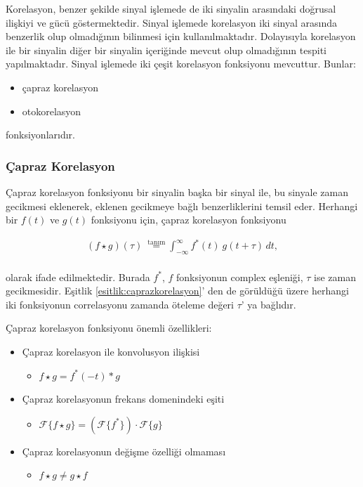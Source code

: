 \documentclass[turkish]{report}
\begin{document}
Korelasyon, benzer şekilde sinyal işlemede de iki sinyalin arasındaki doğrusal ilişkiyi ve gücü göstermektedir. Sinyal işlemede korelasyon iki sinyal arasında benzerlik olup olmadığının bilinmesi için kullanılmaktadır\cite{realtimesignalprocessing}. Dolayısıyla korelasyon ile bir sinyalin diğer bir sinyalin içeriğinde mevcut olup olmadığının tespiti yapılmaktadır. Sinyal işlemede iki çeşit korelasyon fonksiyonu mevcuttur. Bunlar: 
\\

\begin{itemize}
\item çapraz korelasyon
\item otokorelasyon 
\end{itemize}

fonksiyonlarıdır. 

\subsubsection*{Çapraz Korelasyon}

Çapraz korelasyon fonksiyonu bir sinyalin başka bir sinyal ile, bu sinyale zaman gecikmesi eklenerek, eklenen gecikmeye bağlı benzerliklerini temsil eder. Herhangi bir  $f\left(t\right)$ ve $g\left(t\right)$ fonksiyonu için, çapraz korelasyon fonksiyonu

\begin{align}
(f \star g)(\tau)\ \stackrel{\mathrm{tanım}}{=} \int_{-\infty}^{\infty} f^*(t)\ g(t+\tau)\,dt,
\label{esitlik:caprazkorelasyon}
\end{align}
\\
olarak ifade edilmektedir. Burada $f^*$, $f$ fonksiyonun complex eşleniği, $\tau$ ise zaman gecikmesidir. Eşitlik \ref{esitlik:caprazkorelasyon}' den de görüldüğü üzere herhangi iki fonksiyonun correlasyonu zamanda öteleme değeri $\tau$' ya bağlıdır.

Çapraz korelasyon fonksiyonu önemli özellikleri:\\

\begin{itemize}
\item[]{Çapraz korelasyon ile konvolusyon ilişkisi}
\begin{itemize}
\item[]{$f\star g = f^*(-t)*g$}
\end{itemize}
\item[]{Çapraz korelasyonun frekans domenindeki eşiti}
\begin{itemize}
\item[]{$\mathcal{F}\{f\star g\}=(\mathcal{F}\{f^*\}) \cdot \mathcal{F}\{g\}$}
\end{itemize}
\item[]{Çapraz korelasyonun değişme özelliği olmaması}
\begin{itemize}
\item[]{$f\star g \neq g\star f$}
\end{itemize}
\end{itemize}
\end{document}
